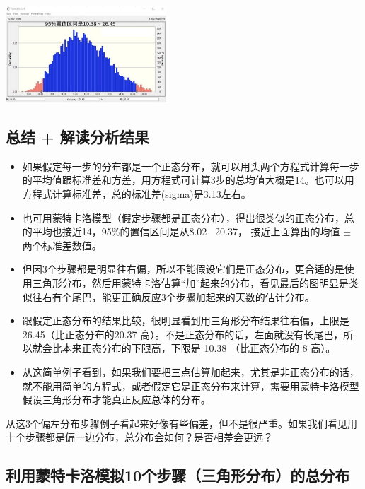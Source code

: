 \includegraphics[width=6cm]{微信图片_20240117093446.jpg}

\hypertarget{ux603bux7ed3-ux89e3ux8bfbux5206ux6790ux7ed3ux679c}{%
\subsection{总结 +
解读分析结果}\label{ux603bux7ed3-ux89e3ux8bfbux5206ux6790ux7ed3ux679c}}

\begin{itemize}
\tightlist
\item
  如果假定每一步的分布都是一个正态分布，就可以用头两个方程式计算每一步的平均值跟标准差和方差，用方程式可计算3步的总均值大概是14。也可以用方程式计算标准差，总的标准差(sigma)是3.13左右。
  
\item
  也可用蒙特卡洛模型（假定步骤都是正态分布），得出很类似的正态分布，总的平均也接近14，95\%的置信区间是从8.02~ 20.37，
  接近上面算出的均值 \(\pm\) 两个标准差数值。
\item
  但因3个步骤都是明显往右偏，所以不能假设它们是正态分布，更合适的是使用三角形分布，然后用蒙特卡洛估算``加''起来的分布，看见最后的图明显是类似往右有个尾巴，能更正确反应3个步骤加起来的天数的估计分布。
\item
  跟假定正态分布的结果比较，很明显看到用三角形分布结果往右偏，上限是
  26.45（比正态分布的20.37
  高）。不是正态分布的话，左面就没有长尾巴，所以就会比本来正态分布的下限高，下限是
  10.38 （比正态分布的 8 高）。
\item
  从这简单例子看到，如果我们要把三点估算加起来，尤其是非正态分布的话，就不能用简单的方程式，或者假定它是正态分布来计算，需要用蒙特卡洛模型假设三角形分布才能真正反应总体的分布。\\
\end{itemize}

从这3个偏左分布步骤例子看起来好像有些偏差，但不是很严重。如果我们看见用十个步骤都是偏一边分布，总分布会如何？是否相差会更远？

\hypertarget{ux5229ux7528ux8499ux7279ux5361ux6d1bux6a21ux62df10ux4e2aux6b65ux9aa4ux4e09ux89d2ux5f62ux5206ux5e03ux7684ux603bux5206ux5e03}{%
\subsection{利用蒙特卡洛模拟10个步骤（三角形分布）的总分布}\label{ux5229ux7528ux8499ux7279ux5361ux6d1bux6a21ux62df10ux4e2aux6b65ux9aa4ux4e09ux89d2ux5f62ux5206ux5e03ux7684ux603bux5206ux5e03}}

